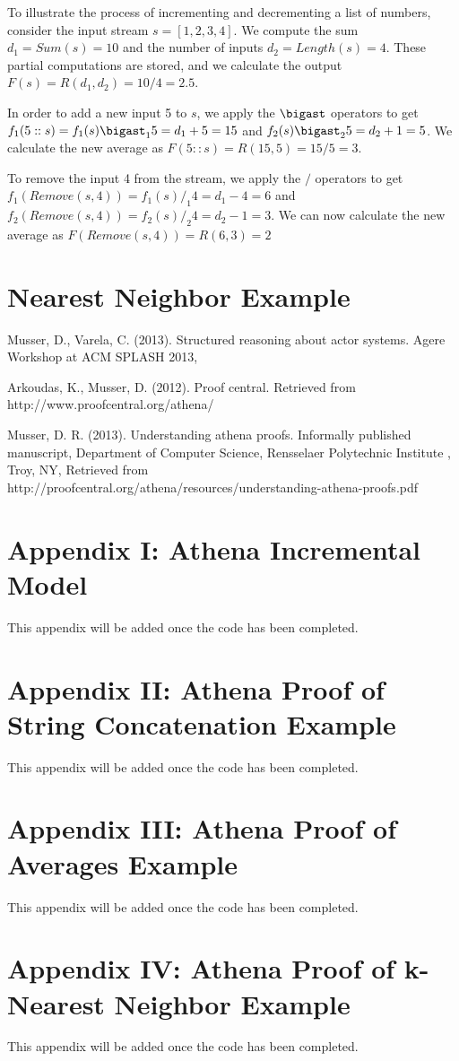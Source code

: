 \documentclass[30pt]{article}
\begin{document}
\noindent To illustrate the process of incrementing and decrementing a list of numbers, consider the input stream $s = [1, 2, 3, 4]$. We compute the sum $d_1 = Sum(s) = 10$ and the number of inputs $d_2 = Length(s) = 4$. These partial computations are stored, and we calculate the output $F(s) = R(d_1, d_2) = 10 / 4 = 2.5$. 

\indent In order to add a new input 5 to $s$, we apply the $\bigast$ operators to get $f_1(5::s) = f_1(s) \bigast_1 5 = d_1 + 5 = 15$ and $f_2(s) \bigast_2 5 = d_2 +1 = 5$. We calculate the new average as $F(5::s) = R(15, 5) = 15 / 5 = 3$.

\indent To remove the input 4 from the stream, we apply the $/$ operators to get $f_1(Remove(s, 4)) = f_1(s) /_1 4 = d_1 - 4 = 6$ and $f_2(Remove(s, 4)) = f_2(s) /_2 4 = d_2 - 1 = 3.$ We can now calculate the new average as $F(Remove(s, 4)) = R(6, 3) = 2$ 


\section {Nearest Neighbor Example}






\begin{thebibliography}{19}


  Musser, D., Varela, C. (2013). Structured reasoning about actor systems. Agere Workshop at ACM SPLASH 2013,

 Arkoudas, K.,  Musser, D. (2012). Proof central. Retrieved from http://www.proofcentral.org/athena/

 Musser, D. R. (2013). Understanding athena proofs. Informally published manuscript, Department of Computer Science, Rensselaer Polytechnic Institute , Troy, NY,  Retrieved from http://proofcentral.org/athena/resources/understanding-athena-proofs.pdf

\end{thebibliography}

\small
{}
\section*{Appendix I: Athena Incremental Model}
\noindent This appendix will be added once the code has been completed.
\section*{Appendix II: Athena Proof of String Concatenation Example}
\noindent This appendix will be added once the code has been completed.
\section*{Appendix III: Athena Proof of Averages Example}
\noindent This appendix will be added once the code has been completed.
\section*{Appendix IV: Athena Proof of k-Nearest Neighbor Example}
\noindent This appendix will be added once the code has been completed.

%
\end{document}
